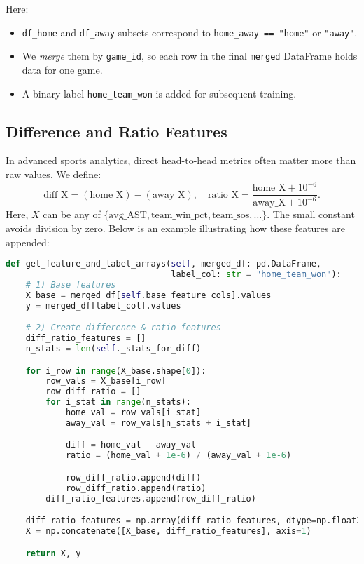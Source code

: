 \documentclass[12pt]{article}
\begin{document}
\noindent
Here:
\begin{itemize}
    \item \texttt{df\_home} and \texttt{df\_away} subsets correspond to \texttt{home\_away == "home"} or \texttt{"away"}.
    \item We \emph{merge} them by \texttt{game\_id}, so each row in the final \texttt{merged} DataFrame holds data for one game.
    \item A binary label \texttt{home\_team\_won} is added for subsequent training.
\end{itemize}

\subsection{Difference and Ratio Features}
In advanced sports analytics, direct head-to-head metrics often matter more than raw values. We define:
\[
\text{diff\_X} = (\text{home\_X}) - (\text{away\_X}), 
\quad 
\text{ratio\_X} = \frac{\text{home\_X} + 10^{-6}}{\text{away\_X} + 10^{-6}}.
\]
Here, \(X\) can be any of \(\{ \text{avg\_AST}, \text{team\_win\_pct}, \text{team\_sos}, \ldots \}\). The small constant avoids division by zero. Below is an example illustrating how these features are appended:

\begin{lstlisting}[language=Python]
def get_feature_and_label_arrays(self, merged_df: pd.DataFrame, 
                                 label_col: str = "home_team_won"):
    # 1) Base features
    X_base = merged_df[self.base_feature_cols].values
    y = merged_df[label_col].values

    # 2) Create difference & ratio features
    diff_ratio_features = []
    n_stats = len(self._stats_for_diff)

    for i_row in range(X_base.shape[0]):
        row_vals = X_base[i_row]
        row_diff_ratio = []
        for i_stat in range(n_stats):
            home_val = row_vals[i_stat]
            away_val = row_vals[n_stats + i_stat]

            diff = home_val - away_val
            ratio = (home_val + 1e-6) / (away_val + 1e-6)

            row_diff_ratio.append(diff)
            row_diff_ratio.append(ratio)
        diff_ratio_features.append(row_diff_ratio)

    diff_ratio_features = np.array(diff_ratio_features, dtype=np.float32)
    X = np.concatenate([X_base, diff_ratio_features], axis=1)

    return X, y
\end{lstlisting}
\end{document}
